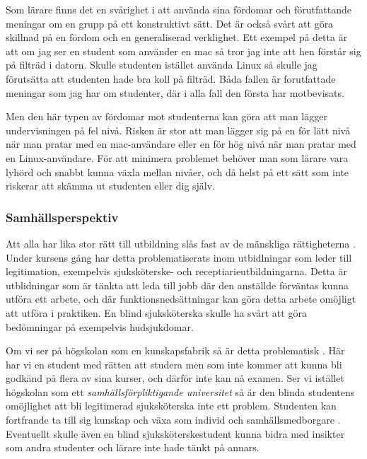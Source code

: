 \documentclass[a4paper, 10pt]{article}
\begin{document}
Som lärare finns det en svårighet i att använda 
sina fördomar och förutfattande meningar om en 
grupp på ett konstruktivt sätt. Det är också 
svårt att göra skillnad på en fördom och en 
generaliserad verklighet. Ett exempel på detta 
är att om jag ser en student som använder en 
mac så tror jag inte att hen förstår sig på 
filträd i datorn. Skulle studenten istället 
använda Linux så skulle jag förutsätta att 
studenten hade bra koll på filträd. Båda fallen 
är forutfattade meningar som jag har om 
studenter, där i alla fall den första har 
motbevisats.

Men den här typen av fördomar mot studenterna 
kan göra att man lägger undervisningen på fel 
nivå. Risken är stor att man lägger sig på en 
för lätt nivå när man pratar med en 
mac-användare eller en för hög nivå när man 
pratar med en Linux-användare. För att minimera 
problemet behöver man som lärare vara lyhörd och 
snabbt kunna växla mellan nivåer, och då helst 
på ett sätt som inte riskerar att skämma ut 
studenten eller dig själv.

\subsubsection{Samhällsperspektiv}

Att alla har lika stor rätt till utbildning 
slås fast av de mänskliga rättigheterna 
\parencite[sida 7]{unhumanrights}. Under kursens
gång har detta problematiserats inom 
utbidlningar som leder till legitimation, 
exempelvis sjuksköterske- och 
receptiarieutbildningarna. Detta är utblidningar 
som är tänkta att leda till jobb där den 
anställde förväntas kunna utföra ett arbete, 
och där funktionsnedsättningar kan göra 
detta arbete omöjligt att utföra i praktiken.
En blind sjuksköterska skulle ha svårt 
att göra bedömningar på exempelvis hudsjukdomar.

Om vi ser på högskolan som en kunskapsfabrik så 
är detta problematisk 
\parencite[sida 274]{branden2022}. 
Här har vi en student med  rätten att studera 
men som inte kommer att kunna bli godkänd på 
flera av sina kurser, och därför inte kan nå 
examen. Ser vi istället högskolan som ett 
\textit{samhällsförpliktigande universitet} så 
är den blinda studentens omöjlighet att bli 
legitimerad sjuksköterska inte ett problem. Studenten 
kan fortfrande ta till sig kunskap och växa 
som individ och samhällsmedborgare 
\parencite[sida 283]{branden2022}. Eventuellt 
skulle även en blind sjuksköterskestudent kunna 
bidra med insikter som andra studenter och 
lärare inte hade tänkt på annars.
\end{document}
